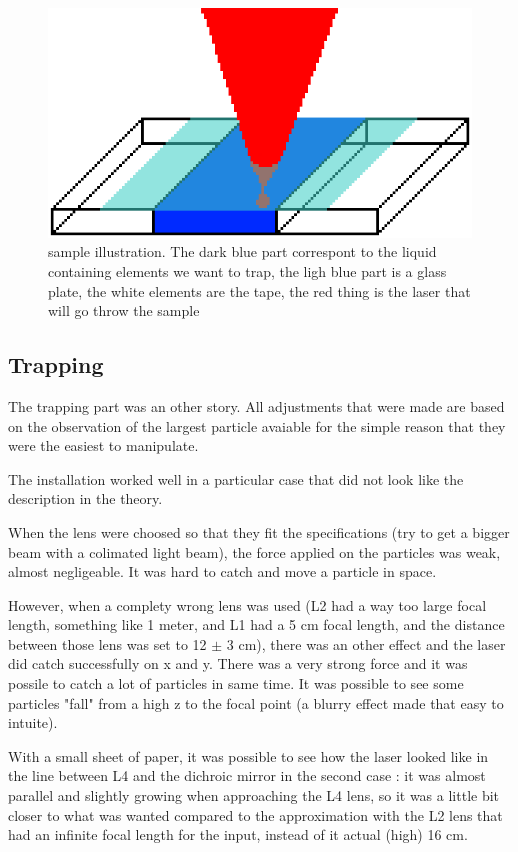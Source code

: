 \documentclass[a4paper,12pt,twoside]{article}	%
\begin{document}
\begin{figure}[h]
	\begin{center}
	\includegraphics[width=0.7\linewidth,angle=0]{./figures/sample}
	\caption{sample illustration. The dark blue part correspont to the liquid containing elements we want to trap, the ligh blue part is a glass plate, the white elements are the tape, the red thing is the laser that will go throw the sample} \label{fig:sample}
	\end{center}
\end{figure}

\subsection{Trapping}

The trapping part was an other story. All adjustments that were made are based on the observation of the largest particle avaiable for the simple reason that they were the easiest to manipulate.

The installation worked well in a particular case that did not look like the description in the theory.

When the lens were choosed so that they fit the specifications (try to get a bigger beam with a colimated light beam), the force applied on the particles was weak, almost negligeable. It was hard to catch and move a particle in space.

However, when a complety wrong lens was used (L2 had a way too large focal length, something like 1 meter, and L1 had a 5 cm focal length, and the distance between those lens was set to 12 $\pm$ 3 cm), there was an other effect and the laser did catch successfully on x and y. There was a very strong force and it was possile to catch a lot of particles in same time. It was possible to see some particles "fall" from a high z to the focal point (a blurry effect made that easy to intuite).

With a small sheet of paper, it was possible to see how the laser looked like in the line between L4 and the dichroic mirror in the second case : it was almost parallel and slightly growing when approaching the L4 lens, so it was a little bit closer to what was wanted compared to the approximation with the L2 lens that had an infinite focal length for the input, instead of it actual (high) 16 cm.
\end{document}
